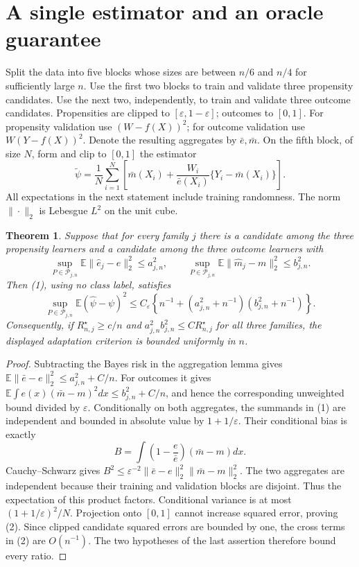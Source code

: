 \documentclass[11pt]{article}
\newtheorem{theorem}{Theorem}
\theoremstyle{definition}
\begin{document}
\section*{A single estimator and an oracle guarantee}
Split the data into five blocks whose sizes are between $n/6$ and $n/4$
for sufficiently large $n$. Use the first two blocks to train and validate
three propensity candidates. Use the next two, independently, to train and
validate three outcome candidates. Propensities are clipped to
$[\varepsilon,1-\varepsilon]$; outcomes to $[0,1]$.
For propensity validation use $(W-f(X))^2$; for outcome validation use
$W(Y-f(X))^2$. Denote the resulting aggregates by $\bar e,\bar m$.
On the fifth block, of size $N$, form and clip to $[0,1]$ the estimator
\[
 \widetilde\psi=\frac1N\sum_{i=1}^N
 \left[\bar m(X_i)+\frac{W_i}{\bar e(X_i)}
                  \{Y_i-\bar m(X_i)\}\right].                 \tag{1}
\]
All expectations in the next statement include training randomness.
The norm $\|\cdot\|_2$ is Lebesgue $L^2$ on the unit cube.
\begin{theorem}
Suppose that for every family $j$ there is a candidate among the three
propensity learners and a candidate among the three outcome learners with
\[
 \sup_{P\in\mathcal P_{j,n}}\mathbb E\|\widehat e_j-e\|_2^2
 \le a_{j,n}^2,\qquad
 \sup_{P\in\mathcal P_{j,n}}\mathbb E\|\widehat m_j-m\|_2^2
 \le b_{j,n}^2.
\]
Then (1), using no class label, satisfies
\[
 \sup_{P\in\mathcal P_{j,n}}\mathbb E(\widehat\psi-\psi)^2
 \le C_\varepsilon\left\{n^{-1}+
       (a_{j,n}^2+n^{-1})(b_{j,n}^2+n^{-1})\right\}.       \tag{2}
\]
Consequently, if $R_{n,j}^\star\ge c/n$ and
$a_{j,n}^2b_{j,n}^2\le C R_{n,j}^\star$ for all three families,
the displayed adaptation criterion is bounded uniformly in $n$.
\end{theorem}
\begin{proof}
Subtracting the Bayes risk in the aggregation lemma gives
$\mathbb E\|\bar e-e\|_2^2\le a_{j,n}^2+C/n$.
For outcomes it gives
$\mathbb E\int e(x)(\bar m-m)^2dx\le b_{j,n}^2+C/n$,
and hence the corresponding unweighted bound divided by $\varepsilon$.
Conditionally on both aggregates, the summands in (1) are independent and
bounded in absolute value by $1+1/\varepsilon$. Their conditional bias is exactly
\[
 B=\int\left(1-\frac{e}{\bar e}\right)(\bar m-m)dx.
\]
Cauchy--Schwarz gives
$B^2\le\varepsilon^{-2}\|\bar e-e\|_2^2\|\bar m-m\|_2^2$.
The two aggregates are independent because their training and validation
blocks are disjoint. Thus the expectation of this product factors. Conditional
variance is at most $(1+1/\varepsilon)^2/N$. Projection onto $[0,1]$
cannot increase squared error, proving (2). Since clipped candidate squared
errors are bounded by one, the cross terms in (2) are $O(n^{-1})$.
The two hypotheses of the last assertion therefore bound every ratio.
\end{proof}
\end{document}
